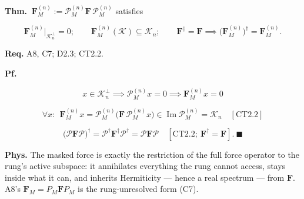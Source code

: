 \begin{theorem}\label{tag:CT2-3}
\textbf{Thm.} $\ \mathbf F_M^{(n)}:=\mathcal P_M^{(n)}\mathbf F\,\mathcal P_M^{(n)}$ satisfies

\[
\mathbf F_M^{(n)}\big|_{\mathcal K_n^\perp}=0;\qquad
\mathbf F_M^{(n)}(\mathcal K)\subseteq\mathcal K_n;\qquad
\mathbf F^\dagger=\mathbf F\implies\bigl(\mathbf F_M^{(n)}\bigr)^\dagger=\mathbf F_M^{(n)}.
\]

\textbf{Req.} A8, C7; D2.3; CT2.2.

\textbf{Pf.}

\[
x\in\mathcal K_n^\perp\implies\mathcal P_M^{(n)}x=0\implies\mathbf F_M^{(n)}x=0
\]

\[
\forall x:\ \ \mathbf F_M^{(n)}x=\mathcal P_M^{(n)}\bigl(\mathbf F\,\mathcal P_M^{(n)}x\bigr)\in\operatorname{Im}\mathcal P_M^{(n)}=\mathcal K_n\quad[\mathrm{CT2.2}]
\]

\[
\bigl(\mathcal P\mathbf F\mathcal P\bigr)^\dagger=\mathcal P^\dagger\mathbf F^\dagger\mathcal P^\dagger=\mathcal P\mathbf F\mathcal P\quad[\mathrm{CT2.2};\ \mathbf F^\dagger=\mathbf F].\ \blacksquare
\]

\textbf{Phys.} The masked force is exactly the restriction of the full force operator to the rung’s active subspace: it annihilates everything the rung cannot access, stays inside what it can, and inherits Hermiticity — hence a real spectrum — from $\mathbf F$. A8’s $\mathbf F_M=P_M\mathbf F P_M$ is the rung-unresolved form (C7).

\end{theorem}

